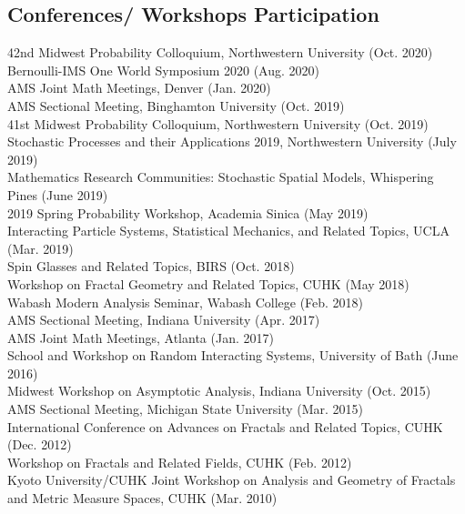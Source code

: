 \documentclass[margin,line,pifont,palatino,courier]{res}
\begin{document}
\begin{resume}
\section{\sc Conferences/ Workshops Participation}
42nd Midwest Probability Colloquium, Northwestern University (Oct. 2020)\\
Bernoulli-IMS One World Symposium 2020 (Aug. 2020)\\
AMS Joint Math Meetings, Denver (Jan. 2020)\\
AMS Sectional Meeting, Binghamton University (Oct. 2019)\\
41st Midwest Probability Colloquium, Northwestern University (Oct. 2019)\\
Stochastic Processes and their Applications 2019, Northwestern University (July 2019)\\
Mathematics Research Communities: Stochastic Spatial Models, Whispering Pines (June 2019)\\
2019 Spring Probability Workshop, Academia Sinica (May 2019)\\
Interacting Particle Systems, Statistical Mechanics, and Related Topics, UCLA (Mar. 2019)\\
Spin Glasses and Related Topics, BIRS (Oct. 2018)\\
Workshop on Fractal Geometry and Related Topics, CUHK (May 2018)\\
Wabash Modern Analysis Seminar, Wabash College (Feb. 2018)\\
AMS Sectional Meeting, Indiana University (Apr. 2017)\\
AMS Joint Math Meetings, Atlanta (Jan. 2017)\\
School and Workshop on Random Interacting Systems, University of Bath (June 2016)\\
Midwest Workshop on Asymptotic Analysis, Indiana University (Oct. 2015)\\
AMS Sectional Meeting, Michigan State University (Mar. 2015)\\
International Conference on Advances on Fractals and Related Topics, CUHK (Dec. 2012)\\
Workshop on Fractals and Related Fields, CUHK (Feb. 2012)\\
Kyoto University/CUHK Joint Workshop on Analysis and Geometry of Fractals and Metric Measure Spaces, CUHK (Mar. 2010)



\end{resume}
\end{document}
